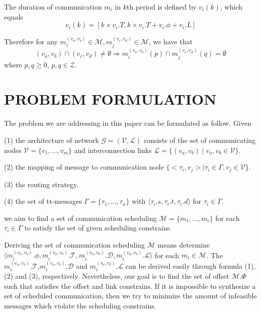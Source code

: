 \documentclass[journal]{IEEEtran}
\begin{document}
The duration of communication $m_{i}$ in $\mathit{k}$th period is defined by $v_i(k)$, which equals
\begin{equation}
	v_i(k)
	=
	[
	k\times v_i.T
	,
	k\times v_i.T+v_i.\phi+v_i.L
	]
\end{equation}

Therefore for any $ {m_{i}^{(v_{a},v_{b})}}\in\mathcal{M}, {m_{j}^{(v_{c},v_{d})}}\in\mathcal{M}$, we have that
\begin{equation}
	(v_{a},v_{b})
	\cap
	(c_{c},v_{d})
	\neq
	\emptyset
	\Longrightarrow
	{m_{i}^{(v_{a},v_{b})}}(p)
	\cap
	{m_{j}^{(v_{c},v_{d})}}(q)
	=
	\emptyset	
\end{equation}
where $p,q\geq 0$, $p,q\in\mathcal{Z}$.

\section{PROBLEM FORMULATION\label{s:formulation}}
The problem we are addressing in this paper can be formulated as follow. Given 

(1) the architecture of  network $\mathcal{G}=(\mathcal{V},\mathcal{L})$ consists of the set of communicating nodes $\mathcal{V}=\{\mathit{v}_{1},\dots,\mathit{v}_{m}\}$ and interconnection links $\mathcal{L}=\{ (v_{a},v_{b}) \mid  v_{a},v_{b}\in \mathcal{V}\}$.

(2) the mapping of message to communication node $\{<\tau_{i},v_{j}>\mid \tau_{i}\in\Gamma,v_{j}\in\mathcal{V}$\}. 

(3) the routing strategy.

(4) the set of tt-messages $ \Gamma = \{\tau_{1},\dots,\tau_{n} \}$ with  $\langle \tau_{i}.s, \tau_{i}.t, \tau_{i}.d\rangle$ for $\tau_{i}\in \Gamma$.

we aim to find a set of communication scheduling $\mathcal{M} = \{m_{1},\dots,m_{i}\}$ for each $\tau_{i}\in \Gamma $ to satisfy the set of given scheduling constrains. 

Deriving the set of communication scheduling $\mathcal{M}$ means determine $\langle m_{i}^{(v_{a},v_{b})}.\phi, m_{i}^{(v_{a},v_{b})}.\mathcal{T}, m_{i}^{(v_{a},v_{b})}.\mathcal{D},m_{i}^{(v_{a},v_{b})}.\mathcal{L} \rangle$ for each $m_{i}\in \mathcal{M}$. The $m_{i}^{(v_{a},v_{b})}.\mathcal{T}$,$m_{i}^{(v_{a},v_{b})}.\mathcal{D}$ and $m_{i}^{(v_{a},v_{b})}.\mathcal{L}$ can be derived easily through formula (1),(2) and (3), respectively. Nevertheless, our goal is to find the set of offset $\mathcal{M}.\Phi$ such that satisfies the offset and link constrains. If it is impossible to synthesize a set of scheduled communication, then we try to minimize the amount of infeasible messages which violate the scheduling constrains.
\end{document}

